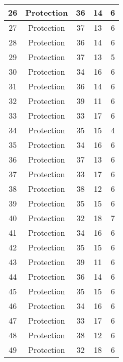 \documentclass[results.tex]{subfiles}
\begin{document}
\begin{center}
\begin{tabular}{| c || c | c | c | c |}
    \hline
    26 & Protection & 36 & 14 & 6 \\ 
    \hline
    27 & Protection & 37 & 13 & 6 \\ 
    \hline
    28 & Protection & 36 & 14 & 6 \\ 
    \hline
    29 & Protection & 37 & 13 & 5 \\ 
    \hline
    30 & Protection & 34 & 16 & 6 \\ 
    \hline
    31 & Protection & 36 & 14 & 6 \\ 
    \hline
    32 & Protection & 39 & 11 & 6 \\ 
    \hline
    33 & Protection & 33 & 17 & 6 \\ 
    \hline
    34 & Protection & 35 & 15 & 4 \\ 
    \hline
    35 & Protection & 34 & 16 & 6 \\ 
    \hline
    36 & Protection & 37 & 13 & 6 \\ 
    \hline
    37 & Protection & 33 & 17 & 6 \\ 
    \hline
    38 & Protection & 38 & 12 & 6 \\ 
    \hline
    39 & Protection & 35 & 15 & 6 \\ 
    \hline
    40 & Protection & 32 & 18 & 7 \\ 
    \hline
    41 & Protection & 34 & 16 & 6 \\ 
    \hline
    42 & Protection & 35 & 15 & 6 \\ 
    \hline
    43 & Protection & 39 & 11 & 6 \\ 
    \hline
    44 & Protection & 36 & 14 & 6 \\ 
    \hline
    45 & Protection & 35 & 15 & 6 \\ 
    \hline
    46 & Protection & 34 & 16 & 6 \\ 
    \hline
    47 & Protection & 33 & 17 & 6 \\ 
    \hline
    48 & Protection & 38 & 12 & 6 \\ 
    \hline
    49 & Protection & 32 & 18 & 6 \\ 
    \hline   \end{tabular}
\end{center}
\end{document}
